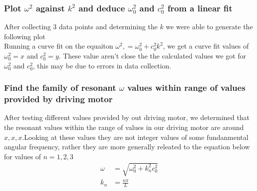 \documentclass{article}
\begin{document}
\newpage
\subsubsection*{Plot $\omega^2$ against $k^2$ and deduce $\omega_0^2$ and $c^2_0$
from a linear fit}
After collecting 3 data points and determining the $k$ we were able to generate
the following plot\\
Running a curve fit on the equaiton $\omega^2, = \omega_0^2 + c_0^2k^2$, we get
a curve fit values of $\omega_0^2 = x$ and $c_0^2 = y$. These value aren't close
the the calculated values we got for $\omega_0^2$ and $c_0^2$, this may be due
to errors in data collection.



\subsubsection*{Find the family of resonant $\omega$ values within range of
values provided by driving motor}
After testing different values provided by out driving motor, we determined that
the resonant values within the range of values in our driving motor are around
$x, x, x$.Looking at these values they are not integer values of some
fundanmental angular frequency, rather they are more generally releated to the
equation below for values of $n = 1,2,3$
\begin{align*}
    \omega &= \sqrt{\omega_0^2 + k_n^2c_0^2}\\
    k_n &= \frac{n\pi}{L}
\end{align*}
\end{document}
